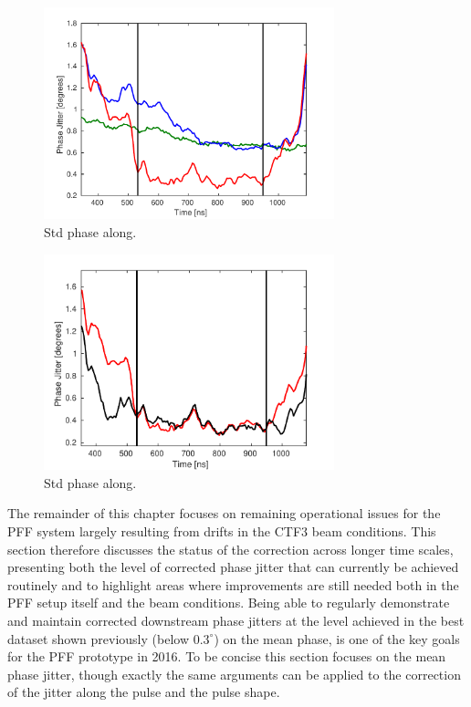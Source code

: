 \begin{figure}
  \centering
  \includegraphics[width=0.75\textwidth]{Figures/feedforward/BestFF_StdPhaseAlong}
  \caption{Std phase along.}
  \label{f:BestFF_StdPhaseAlong}
\end{figure}

\begin{figure}
  \centering
  \includegraphics[width=0.75\textwidth]{Figures/feedforward/BestFF_SimStdAlongPulse}
  \caption{Std phase along.}
  \label{f:BestFF_SimStdPhaseAlong}
\end{figure}


The remainder of this chapter focuses on remaining operational issues for the PFF system largely resulting from drifts in the CTF3 beam conditions. This section therefore 
discusses the status of the correction across longer time scales, presenting both the 
level of corrected phase jitter that can currently be achieved routinely and to 
highlight areas where improvements are still needed both in the PFF setup itself and the beam conditions. Being able to regularly demonstrate and maintain corrected downstream 
phase jitters at the level achieved in the best dataset shown previously (below 
\(0.3^\circ\)) on the mean phase, is one of the key goals for the PFF prototype in 2016. To be concise this section focuses on the mean phase jitter, though exactly the same 
arguments can be applied to the correction of the jitter along the pulse and the pulse 
shape.

